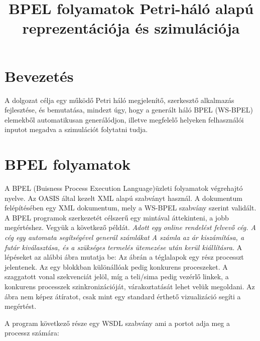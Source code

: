 \documentclass[12pt,a4paper]{book}
\date{\vspace{-5ex}}
\title{BPEL folyamatok Petri-háló alapú reprezentációja és szimulációja}
\begin{document}
\maketitle
\newpage
\tableofcontents

\chapter{Bevezetés}

A dolgozat célja egy működő Petri háló  megjelenítő, szerkesztő %
alkalmazás fejlesztése, és bemutatása, mindezt úgy, hogy a generált háló BPEL (WS-BPEL) elemekből automatikusan generálódjon, illetve megfelelő helyeken felhasználói inputot megadva a szimulációt folytatni tudja.  %

\chapter{BPEL folyamatok}

A BPEL (Buisness Process Execution Language)üzleti folyamatok végrehajtó nyelve.
Az OASIS által kezelt XML alapú szabványt használ. 
A dokumentum felépítésében egy XML dokumentum, mely a WS-BPEL szabvány szerint validált. A BPEL programok szerkezetét célszerű egy mintával áttekinteni, a jobb megértéshez. %
Vegyük a következő példát.  \textsl{Adott egy online rendelést felvevő cég. A cég egy automata segítségével generál számlákat A számla az ár kiszámítása, a futár kiválasztása, és a szükséges termelés ütemezése után kerül kiállításra.} A lépéseket az alábbi ábra mutatja be: %
Az ábrán a téglalapok egy rész processzt jelentenek. Az egy blokkban különállóak pedig konkurens proceszeket. A szaggatott vonal szekvenciát jelöl, míg a teli/sima pedig vezérlő linkek, a konkurens processzek szinkronizációját, várakoztatását lehet velük megoldani. Az ábra nem képez átíratot, csak mint egy standard érthető vizualizáció segíti a megértést. 

A program következő része egy WSDL szabvány ami a portot adja meg a processz számára:
\newpage
\end{document}

